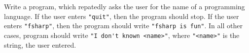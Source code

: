 Write a program, which repatedly asks the user for the name of a programming language. If the user enters \lstinline{"quit"}, then the program should stop. If the user enters \lstinline{"fsharp"}, then the program should write \lstinline{"fsharp is fun"}. In all other cases, program should write \lstinline{"I don't known <name>"}, where \lstinline{"<name>"} is the string, the user entered. 